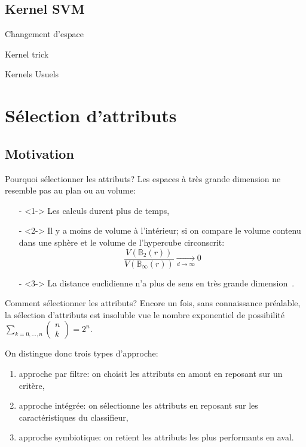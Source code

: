 \documentclass[9pt]{beamer}
\begin{document}
	\subsection[kernel]{Kernel SVM}
	\begin{frame}{Changement d'espace}

	\end{frame}

	\begin{frame}{Kernel trick}

	\end{frame}

	\begin{frame}{Kernels Usuels}

	\end{frame}

	\section[feature selection]{Sélection d'attributs}
	\subsection[motivation]{Motivation}
	\begin{frame}{Pourquoi sélectionner les attributs?}
		Les espaces à très grande dimension ne resemble pas au plan ou au volume:
		\begin{itemize}
			\item[-]<1-> Les calculs durent plus de temps,
			\item[-]<2-> Il y a moins de volume à l'intérieur; si on compare le volume contenu dans une sphère et le volume de l'hypercube circonscrit:
			$$\frac{V(\mathbb{B}_{2}(r))}{V(\mathbb{B}_{\infty}(r))}\xrightarrow[d \to \infty]{} 0$$
			\item[-]<3-> La distance euclidienne n'a plus de sens en très grande dimension~\cite{Domingos:2012:FUT:2347736.2347755}.
		\end{itemize}
	\end{frame}

	\begin{frame}{Comment sélectionner les attributs?}
		Encore un fois, sans connaissance préalable, la sélection d'attributs est insoluble vue le nombre exponentiel de possibilité $\sum_{k=0,\dots,n} \begin{pmatrix}
		n\\
		k
		\end{pmatrix} = 2^n$.

		On distingue donc trois types d'approche:
		\begin{enumerate}
			\item<1-> approche par filtre: on choisit les attributs en amont en reposant sur un critère,
			\item<2-> approche intégrée: on sélectionne les attributs en reposant sur les caractéristiques du classifieur,
			\item<3-> approche symbiotique: on retient les attributs les plus performants en aval.
		\end{enumerate}
	\end{frame}
\end{document}
